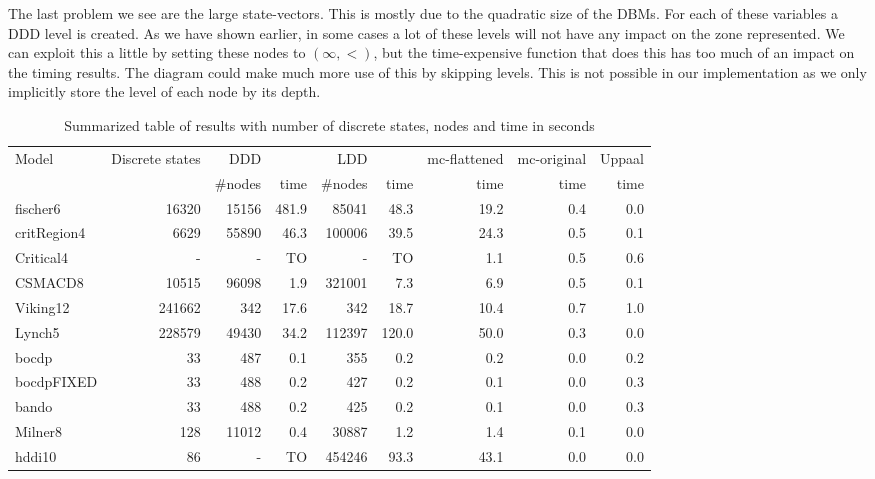 The last problem we see are the large state-vectors. This is mostly due to the quadratic size of the DBMs. For each of these variables a DDD level is created. As we have shown earlier, in some cases a lot of these levels will not have any impact on the zone represented. We can exploit this a little by setting these nodes to $(\infty,<)$, but the time-expensive function that does this has too much of an impact on the timing results. The diagram could make much more use of this by skipping levels. This is not possible in our implementation as we only implicitly store the level of each node by its depth. 

\begin{landscape}
\begin{table}
    \begin{tabular}{|l|r|rr|rr|r|r|r|}
    \hline
     Model      & Discrete states & DDD     & ~     & LDD     & ~     & mc-flattened & mc-original & Uppaal \\
    ~           & ~               & \#nodes & time  & \#nodes & time  & time         & time        & time   \\ \hline
    fischer6    & 16320           & 15156   & 481.9 & 85041   & 48.3  & 19.2         & 0.4         & 0.0    \\
    critRegion4 & 6629            & 55890   & 46.3  & 100006  & 39.5  & 24.3         & 0.5         & 0.1    \\
    Critical4   & -               & -       & TO    & -       & TO    & 1.1          & 0.5         & 0.6    \\
    CSMACD8     & 10515           & 96098   & 1.9   & 321001  & 7.3   & 6.9          & 0.5         & 0.1    \\
    Viking12    & 241662          & 342     & 17.6  & 342     & 18.7  & 10.4         & 0.7         & 1.0    \\
    Lynch5      & 228579          & 49430   & 34.2  & 112397  & 120.0 & 50.0         & 0.3         & 0.0    \\
    bocdp       & 33              & 487     & 0.1   & 355     & 0.2   & 0.2          & 0.0         & 0.2    \\
    bocdpFIXED  & 33              & 488     & 0.2   & 427     & 0.2   & 0.1          & 0.0         & 0.3    \\
    bando       & 33              & 488     & 0.2   & 425     & 0.2   & 0.1          & 0.0         & 0.3    \\
    Milner8     & 128             & 11012   & 0.4   & 30887   & 1.2   & 1.4          & 0.1         & 0.0    \\
    hddi10      & 86              & -       & TO    & 454246  & 93.3  & 43.1         & 0.0         & 0.0    \\ \hline
    \end{tabular}
\caption{Summarized table of results with number of discrete states, nodes and time in seconds}
\label{tab:results-summary}
\end{table}
\end{landscape}

